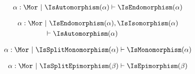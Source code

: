 \begin{sequent}
\begin{align*}
  \alpha:\Mor ~|~ \IsAutomorphism( \alpha ) \vdash \IsEndomorphism( \alpha )
\end{align*}
\end{sequent}

\begin{sequent}
\begin{align*}
  \alpha:\Mor ~&|~  \IsEndomorphism( \alpha ), \IsIsomorphism( \alpha ) \\ 
  &\vdash \IsAutomorphism( \alpha )
\end{align*}
\end{sequent}

\begin{sequent}
\begin{align*}
  \alpha:\Mor ~|~ \IsSplitMonomorphism( \alpha ) \vdash \IsMonomorphism( \alpha )
\end{align*}
\end{sequent}

\begin{sequent}
\begin{align*}
  \alpha:\Mor ~|~ \IsSplitEpimorphism( \beta ) \vdash \IsEpimorphism( \beta )
\end{align*}
\end{sequent}